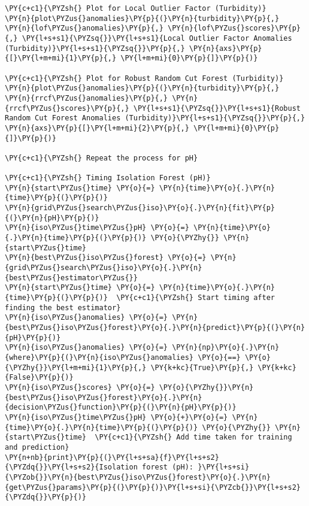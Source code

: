 \begin{tcolorbox}[breakable, size=fbox, boxrule=1pt, pad at break*=1mm,colback=cellbackground, colframe=cellborder]
\begin{Verbatim}[commandchars=\\\{\}]
\PY{c+c1}{\PYZsh{} Plot for Local Outlier Factor (Turbidity)}
\PY{n}{plot\PYZus{}anomalies}\PY{p}{(}\PY{n}{turbidity}\PY{p}{,} \PY{n}{lof\PYZus{}anomalies}\PY{p}{,} \PY{n}{lof\PYZus{}scores}\PY{p}{,} \PY{l+s+s1}{\PYZsq{}}\PY{l+s+s1}{Local Outlier Factor Anomalies (Turbidity)}\PY{l+s+s1}{\PYZsq{}}\PY{p}{,} \PY{n}{axs}\PY{p}{[}\PY{l+m+mi}{1}\PY{p}{,} \PY{l+m+mi}{0}\PY{p}{]}\PY{p}{)}

\PY{c+c1}{\PYZsh{} Plot for Robust Random Cut Forest (Turbidity)}
\PY{n}{plot\PYZus{}anomalies}\PY{p}{(}\PY{n}{turbidity}\PY{p}{,} \PY{n}{rrcf\PYZus{}anomalies}\PY{p}{,} \PY{n}{rrcf\PYZus{}scores}\PY{p}{,} \PY{l+s+s1}{\PYZsq{}}\PY{l+s+s1}{Robust Random Cut Forest Anomalies (Turbidity)}\PY{l+s+s1}{\PYZsq{}}\PY{p}{,} \PY{n}{axs}\PY{p}{[}\PY{l+m+mi}{2}\PY{p}{,} \PY{l+m+mi}{0}\PY{p}{]}\PY{p}{)}

\PY{c+c1}{\PYZsh{} Repeat the process for pH}

\PY{c+c1}{\PYZsh{} Timing Isolation Forest (pH)}
\PY{n}{start\PYZus{}time} \PY{o}{=} \PY{n}{time}\PY{o}{.}\PY{n}{time}\PY{p}{(}\PY{p}{)}
\PY{n}{grid\PYZus{}search\PYZus{}iso}\PY{o}{.}\PY{n}{fit}\PY{p}{(}\PY{n}{pH}\PY{p}{)}
\PY{n}{iso\PYZus{}time\PYZus{}pH} \PY{o}{=} \PY{n}{time}\PY{o}{.}\PY{n}{time}\PY{p}{(}\PY{p}{)} \PY{o}{\PYZhy{}} \PY{n}{start\PYZus{}time}
\PY{n}{best\PYZus{}iso\PYZus{}forest} \PY{o}{=} \PY{n}{grid\PYZus{}search\PYZus{}iso}\PY{o}{.}\PY{n}{best\PYZus{}estimator\PYZus{}}
\PY{n}{start\PYZus{}time} \PY{o}{=} \PY{n}{time}\PY{o}{.}\PY{n}{time}\PY{p}{(}\PY{p}{)}  \PY{c+c1}{\PYZsh{} Start timing after finding the best estimator}
\PY{n}{iso\PYZus{}anomalies} \PY{o}{=} \PY{n}{best\PYZus{}iso\PYZus{}forest}\PY{o}{.}\PY{n}{predict}\PY{p}{(}\PY{n}{pH}\PY{p}{)}
\PY{n}{iso\PYZus{}anomalies} \PY{o}{=} \PY{n}{np}\PY{o}{.}\PY{n}{where}\PY{p}{(}\PY{n}{iso\PYZus{}anomalies} \PY{o}{==} \PY{o}{\PYZhy{}}\PY{l+m+mi}{1}\PY{p}{,} \PY{k+kc}{True}\PY{p}{,} \PY{k+kc}{False}\PY{p}{)}
\PY{n}{iso\PYZus{}scores} \PY{o}{=} \PY{o}{\PYZhy{}}\PY{n}{best\PYZus{}iso\PYZus{}forest}\PY{o}{.}\PY{n}{decision\PYZus{}function}\PY{p}{(}\PY{n}{pH}\PY{p}{)}
\PY{n}{iso\PYZus{}time\PYZus{}pH} \PY{o}{+}\PY{o}{=} \PY{n}{time}\PY{o}{.}\PY{n}{time}\PY{p}{(}\PY{p}{)} \PY{o}{\PYZhy{}} \PY{n}{start\PYZus{}time}  \PY{c+c1}{\PYZsh{} Add time taken for training and prediction}
\PY{n+nb}{print}\PY{p}{(}\PY{l+s+sa}{f}\PY{l+s+s2}{\PYZdq{}}\PY{l+s+s2}{Isolation forest (pH): }\PY{l+s+si}{\PYZob{}}\PY{n}{best\PYZus{}iso\PYZus{}forest}\PY{o}{.}\PY{n}{get\PYZus{}params}\PY{p}{(}\PY{p}{)}\PY{l+s+si}{\PYZcb{}}\PY{l+s+s2}{\PYZdq{}}\PY{p}{)}


\end{Verbatim}
\end{tcolorbox}
